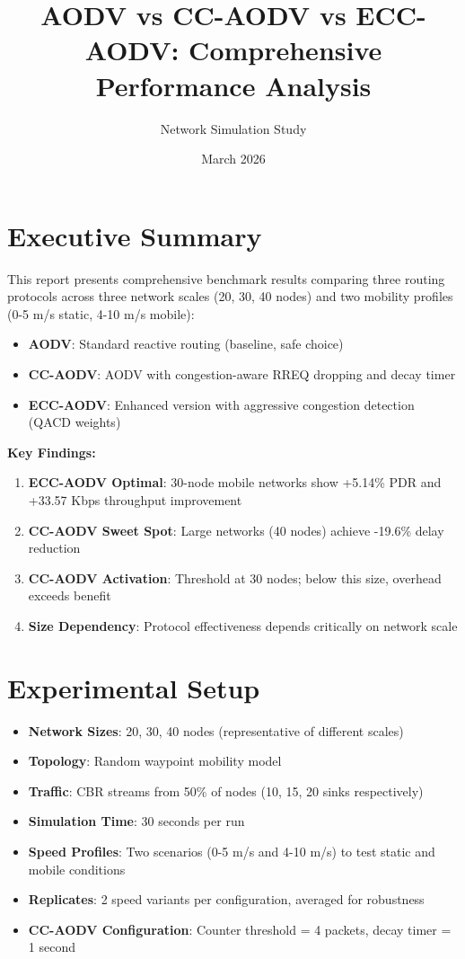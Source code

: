 \documentclass[12pt]{article}
\title{\textbf{AODV vs CC-AODV vs ECC-AODV: Comprehensive Performance Analysis}}
\author{Network Simulation Study}
\date{March 2026}
\begin{document}
\maketitle

\section*{Executive Summary}

This report presents comprehensive benchmark results comparing three routing protocols across three network scales (20, 30, 40 nodes) and two mobility profiles (0-5 m/s static, 4-10 m/s mobile):

\begin{itemize}
    \item \textbf{AODV}: Standard reactive routing (baseline, safe choice)
    \item \textbf{CC-AODV}: AODV with congestion-aware RREQ dropping and decay timer
    \item \textbf{ECC-AODV}: Enhanced version with aggressive congestion detection (QACD weights)
\end{itemize}

\noindent
\textbf{Key Findings:}
\begin{enumerate}
    \item \textbf{ECC-AODV Optimal}: 30-node mobile networks show +5.14\% PDR and +33.57 Kbps throughput improvement
    \item \textbf{CC-AODV Sweet Spot}: Large networks (40 nodes) achieve -19.6\% delay reduction
    \item \textbf{CC-AODV Activation}: Threshold at 30 nodes; below this size, overhead exceeds benefit
    \item \textbf{Size Dependency}: Protocol effectiveness depends critically on network scale
\end{enumerate}

\section*{Experimental Setup}

\begin{itemize}
    \item \textbf{Network Sizes}: 20, 30, 40 nodes (representative of different scales)
    \item \textbf{Topology}: Random waypoint mobility model
    \item \textbf{Traffic}: CBR streams from 50\% of nodes (10, 15, 20 sinks respectively)
    \item \textbf{Simulation Time}: 30 seconds per run
    \item \textbf{Speed Profiles}: Two scenarios (0-5 m/s and 4-10 m/s) to test static and mobile conditions
    \item \textbf{Replicates}: 2 speed variants per configuration, averaged for robustness
    \item \textbf{CC-AODV Configuration}: Counter threshold = 4 packets, decay timer = 1 second
\end{itemize}
\end{document}
